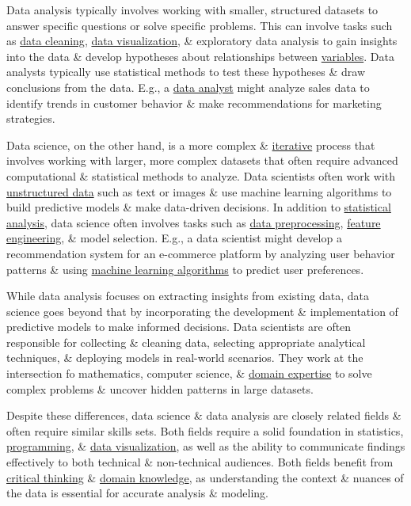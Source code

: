 \documentclass{article}
\begin{document}
Data analysis typically involves working with smaller, structured datasets to answer specific questions or solve specific problems. This can involve tasks such as \href{https://en.wikipedia.org/wiki/Data_cleaning}{data cleaning}, \href{https://en.wikipedia.org/wiki/Data_visualization}{data visualization}, \& exploratory data analysis to gain insights into the data \& develop hypotheses about relationships between \href{https://en.wikipedia.org/wiki/Variable_(research)}{variables}. Data analysts typically use statistical methods to test these hypotheses \& draw conclusions from the data. E.g., a \href{https://en.wikipedia.org/wiki/Data_analyst}{data analyst} might analyze sales data to identify trends in customer behavior \& make recommendations for marketing strategies.

Data science, on the other hand, is a more complex \& \href{https://en.wikipedia.org/wiki/Iterative}{iterative} process that involves working with larger, more complex datasets that often require advanced computational \& statistical methods to analyze. Data scientists often work with \href{https://en.wikipedia.org/wiki/Unstructured_data}{unstructured data} such as text or images \& use machine learning algorithms to build predictive models \& make data-driven decisions. In addition to \href{https://en.wikipedia.org/wiki/Statistical_analysis}{statistical analysis}, data science often involves tasks such as \href{https://en.wikipedia.org/wiki/Data_preprocessing}{data preprocessing}, \href{https://en.wikipedia.org/wiki/Feature_engineering}{feature engineering}, \& model selection. E.g., a data scientist might develop a recommendation system for an e-commerce platform by analyzing user behavior patterns \& using \href{https://en.wikipedia.org/wiki/Machine_learning_algorithms}{machine learning algorithms} to predict user preferences.

While data analysis focuses on extracting insights from existing data, data science goes beyond that by incorporating the development \& implementation of predictive models to make informed decisions. Data scientists are often responsible for collecting \& cleaning data, selecting appropriate analytical techniques, \& deploying models in real-world scenarios. They work at the intersection fo mathematics, computer science, \& \href{https://en.wikipedia.org/wiki/Domain_expertise}{domain expertise} to solve complex problems \& uncover hidden patterns in large datasets.

Despite these differences, data science \& data analysis are closely related fields \& often require similar skills sets. Both fields require a solid foundation in statistics, \href{https://en.wikipedia.org/wiki/Computer_programming}{programming}, \& \href{https://en.wikipedia.org/wiki/Data_visualization}{data visualization}, as well as the ability to communicate findings effectively to both technical \& non-technical audiences. Both fields benefit from \href{https://en.wikipedia.org/wiki/Critical_thinking}{critical thinking} \& \href{https://en.wikipedia.org/wiki/Domain_knowledge}{domain knowledge}, as understanding the context \& nuances of the data is essential for accurate analysis \& modeling.
\end{document}

